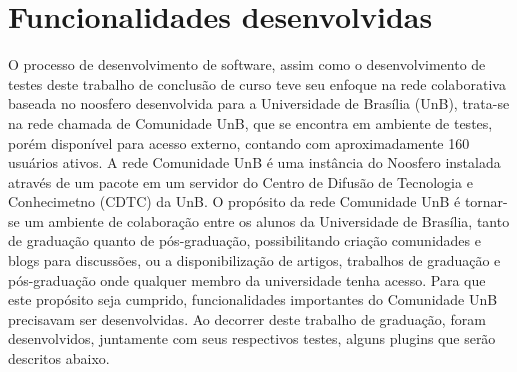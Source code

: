 
\section{Funcionalidades desenvolvidas}
O processo de desenvolvimento de software, assim como o desenvolvimento de testes 
deste trabalho de conclusão de curso teve seu enfoque na rede colaborativa baseada 
no noosfero desenvolvida para a Universidade de Brasília (UnB), trata-se na rede 
chamada de Comunidade UnB, que se encontra em ambiente de testes, porém disponível 
para acesso externo, contando com aproximadamente 160 usuários ativos. A rede 
Comunidade UnB é uma instância do Noosfero instalada através de um pacote em um 
servidor do Centro de Difusão de Tecnologia e Conhecimetno (CDTC) da UnB.
%
O propósito da rede Comunidade UnB é tornar-se um ambiente de colaboração entre os 
alunos da Universidade de Brasília, tanto de graduação quanto de pós-graduação, 
possibilitando criação comunidades e blogs para discussões, ou a disponibilização 
de artigos, trabalhos de graduação e pós-graduação onde qualquer membro da universidade 
tenha acesso.
%
Para que este propósito seja cumprido, funcionalidades importantes do Comunidade 
UnB precisavam ser desenvolvidas. Ao decorrer deste trabalho de graduação, foram 
desenvolvidos, juntamente com seus respectivos testes, alguns plugins que serão 
descritos abaixo.
